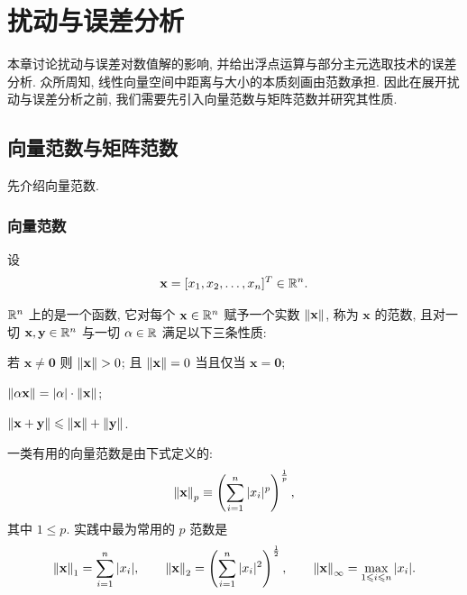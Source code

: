 \chapter{扰动与误差分析}
\label{ch:perturbation}

本章讨论扰动与误差对数值解的影响, 并给出浮点运算与部分主元选取技术的误差分析. 众所周知, 线性向量空间中距离与大小的本质刻画由范数承担. 因此在展开扰动与误差分析之前, 我们需要先引入向量范数与矩阵范数并研究其性质.

\section{向量范数与矩阵范数}
\label{sec:3-1}

先介绍向量范数.

\subsection{向量范数}

设
\[
  \mathbf{x}=[x_1,x_2,\ldots,x_n]^T\in\mathbb{R}^n.
\]

\begin{definition}
\label{def:3-1}
$\mathbb{R}^n$ 上的是一个函数, 它对每个 $\mathbf{x}\in\mathbb{R}^n$ 赋予一个实数 $\left\|\mathbf{x}\right\|$, 称为 $\mathbf{x}$ 的范数, 且对一切 $\mathbf{x},\mathbf{y}\in\mathbb{R}^n$ 与一切 $\alpha\in\mathbb{R}$ 满足以下三条性质:
\begin{romanlist}
  \item 若 $\mathbf{x}\neq\mathbf{0}$ 则 $\norm{\mathbf{x}}>0$; 且 $\left\|\mathbf{x}\right\|=0$ 当且仅当 $\mathbf{x}=\mathbf{0}$;
  \item $\left\|\alpha\mathbf{x}\right\|=|\alpha|\cdot\left\|\mathbf{x}\right\|$;
  \item $\left\|\mathbf{x}+\mathbf{y}\right\|\leqslant\left\|\mathbf{x}\right\|+\left\|\mathbf{y}\right\|$.
\end{romanlist}
\end{definition}

一类有用的向量范数是由下式定义的:
\[
  \left\|\mathbf{x}\right\|_p\equiv\left(\sum_{i=1}^{n}|x_i|^p\right)^{\frac{1}{p}},
\]
其中 $1\leqslant p$. 实践中最为常用的 $p$ 范数是
\[
  \left\|\mathbf{x}\right\|_1=\sum_{i=1}^{n}|x_i|,\qquad
  \left\|\mathbf{x}\right\|_2=\left(\sum_{i=1}^{n}|x_i|^2\right)^{\frac{1}{2}},\qquad
  \left\|\mathbf{x}\right\|_\infty=\max_{1\leqslant i\leqslant n}|x_i|.
\]

